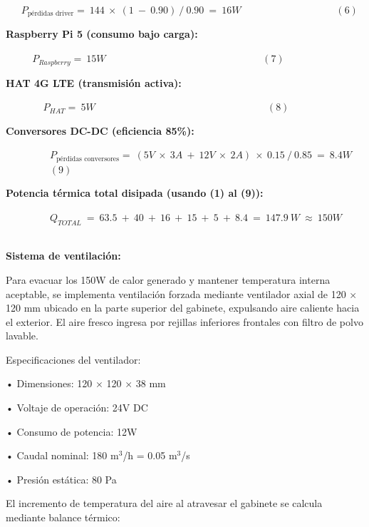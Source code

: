 \documentclass[12pt,a4paper,oneside]{report}
\begin{document}
\(\ \ \ \ \ \ \ P_{\text{pérdidas driver}} = \ 144\  \times \ (1\  - \ 0.90)\ /\ 0.90\  = \ 16W\)\(\ \ \ \ \ \ \ \ \ \ \ \ \ \ \ \ \ \ \ \ \ \ \ \ \ \ \ \ \ \ \ \ \ \ \ \ \ \ \ \ \ \ \ (6)\ \)

\textbf{Raspberry Pi 5 (consumo bajo carga):}

\(\ \ \ \ \ \ \ \ \ \ \ \ P_{Raspberry} = \ 15W\)\(\ \ \ \ \ \ \ \ \ \ \ \ \ \ \ \ \ \ \ \ \ \ \ \ \ \ \ \ \ \ \ \ \ \ \ \ \ \ \ \ \ \ \ \ \ \ \ \ \ \ \ \ \ \ \ \ \ \ \ \ \ \ \ \ \ \ \ \ \ \ \ (7)\ \)

\textbf{HAT 4G LTE (transmisión activa):}

\(\ \ \ \ \ \ \ \ \ \ \ \ {\ \ \ \ \ P}_{HAT} = \ 5W\)\(\ \ \ \ \ \ \ \ \ \ \ \ \ \ \ \ \ \ \ \ \ \ \ \ \ \ \ \ \ \ \ \ \ \ \ \ \ \ \ \ \ \ \ \ \ \ \ \ \ \ \ \ \ \ \ \ \ \ \ \ \ \ \ \ \ \ \ \ \ \ \ \ \ \ \ \ \ \ (8)\ \)

\textbf{Conversores DC-DC (eficiencia 85\%):}

\(\ \ \ \ \ \ \ \ \ \ \ \ \ \ \ \ \ \ \ \ P_{\text{pérdidas conversores}} = \ (5V\  \times \ 3A\  + \ 12V\  \times \ 2A)\  \times \ 0.15\ /\ 0.85\  = \ 8.4W\)\(\ \ \ \ \ \ \ \ \ \ \ \ \ \ \ \ \ \ \ \ (9)\ \)

\textbf{Potencia térmica total disipada (usando (1) al (9)):}

\(\ \ \ \ \ \ \ \ \ \ \ \ \ \ \ \ \ \ \ \ Q_{TOTAL}\  = \ 63.5\  + \ 40\  + \ 16\  + \ 15\  + \ 5\  + \ 8.4\  = \ 147.9\ W\  \approx \ 150W\)\(\ \ \ \ \ \ \ \ \ \ \ \ \)

\textbf{Sistema de ventilación:}

Para evacuar los 150W de calor generado y mantener temperatura interna aceptable, se implementa ventilación forzada mediante ventilador axial de 120 \ensuremath{\times} 120 mm ubicado en la parte superior del gabinete, expulsando aire caliente hacia el exterior. El aire fresco ingresa por rejillas inferiores frontales con filtro de polvo lavable.

Especificaciones del ventilador:

• Dimensiones: 120 \ensuremath{\times} 120 \ensuremath{\times} 38 mm

• Voltaje de operación: 24V DC

• Consumo de potencia: 12W

• Caudal nominal: 180 m\ensuremath{^{3}}/h = 0.05 m\ensuremath{^{3}}/s

• Presión estática: 80 Pa

El incremento de temperatura del aire al atravesar el gabinete se calcula mediante balance térmico:
\end{document}
